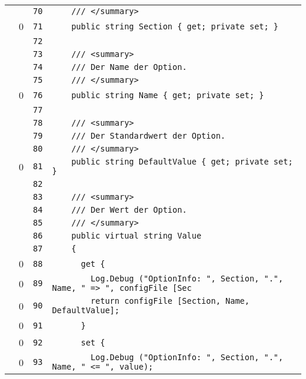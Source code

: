 \documentclass[a4paper,10pt]{article}
\begin{document}
\begin{longtable}[l]{lrrl}
\cellcolor{gray} &  & \verb~70~ & \verb~    /// </summary>~\\
\cellcolor{red} & 0 & \verb~71~ & \verb~    public string Section { get; private set; }~\\
\cellcolor{gray} &  & \verb~72~ & \verb~~\\
\cellcolor{gray} &  & \verb~73~ & \verb~    /// <summary>~\\
\cellcolor{gray} &  & \verb~74~ & \verb~    /// Der Name der Option.~\\
\cellcolor{gray} &  & \verb~75~ & \verb~    /// </summary>~\\
\cellcolor{red} & 0 & \verb~76~ & \verb~    public string Name { get; private set; }~\\
\cellcolor{gray} &  & \verb~77~ & \verb~~\\
\cellcolor{gray} &  & \verb~78~ & \verb~    /// <summary>~\\
\cellcolor{gray} &  & \verb~79~ & \verb~    /// Der Standardwert der Option.~\\
\cellcolor{gray} &  & \verb~80~ & \verb~    /// </summary>~\\
\cellcolor{red} & 0 & \verb~81~ & \verb~    public string DefaultValue { get; private set; }~\\
\cellcolor{gray} &  & \verb~82~ & \verb~~\\
\cellcolor{gray} &  & \verb~83~ & \verb~    /// <summary>~\\
\cellcolor{gray} &  & \verb~84~ & \verb~    /// Der Wert der Option.~\\
\cellcolor{gray} &  & \verb~85~ & \verb~    /// </summary>~\\
\cellcolor{gray} &  & \verb~86~ & \verb~    public virtual string Value~\\
\cellcolor{gray} &  & \verb~87~ & \verb~    {~\\
\cellcolor{red} & 0 & \verb~88~ & \verb~      get {~\\
\cellcolor{red} & 0 & \verb~89~ & \verb~        Log.Debug ("OptionInfo: ", Section, ".", Name, " => ", configFile [Sec~\\
\cellcolor{red} & 0 & \verb~90~ & \verb~        return configFile [Section, Name, DefaultValue];~\\
\cellcolor{red} & 0 & \verb~91~ & \verb~      }~\\
\cellcolor{red} & 0 & \verb~92~ & \verb~      set {~\\
\cellcolor{red} & 0 & \verb~93~ & \verb~        Log.Debug ("OptionInfo: ", Section, ".", Name, " <= ", value);~\\

\end{longtable}
\end{document}
